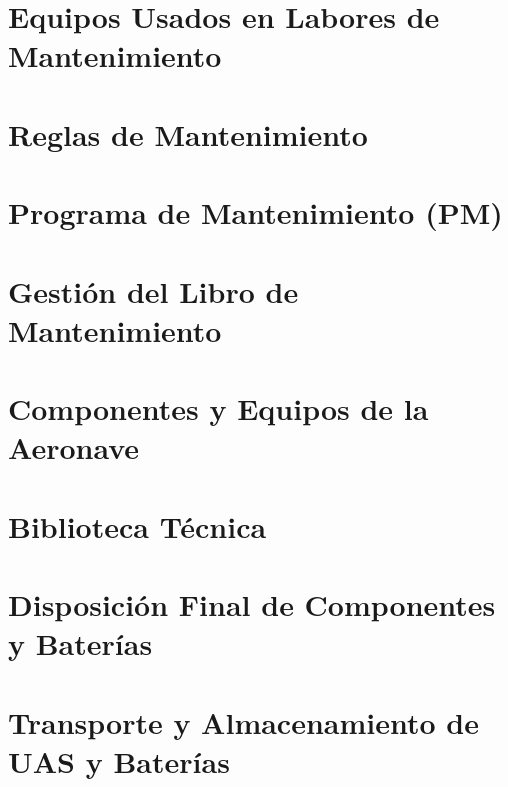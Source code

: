 \documentclass[12pt,openany]{report}
\begin{document}
\chapter{Equipos Usados en Labores de Mantenimiento}
\label{inicio_cap6}

\label{fin_cap6}

\chapter{Reglas de Mantenimiento}
\label{inicio_cap7}

\label{fin_cap7}

\chapter{Programa de Mantenimiento (PM)}
\label{inicio_cap8}

\label{fin_cap8}

\chapter{Gestión del Libro de Mantenimiento}
\label{inicio_cap9}

\label{fin_cap9}

\chapter{Componentes y Equipos de la Aeronave}
\label{inicio_cap10}

\label{fin_cap10}

\chapter{Biblioteca Técnica}
\label{inicio_cap11}

\label{fin_cap11}

\chapter{Disposición Final de Componentes y Baterías}
\label{inicio_cap12}

\label{fin_cap12}

\chapter{Transporte y Almacenamiento de UAS y Baterías}
\label{inicio_cap13}

\label{fin_cap13}
\end{document}
